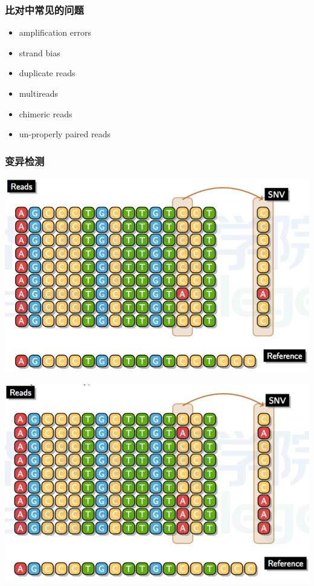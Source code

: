 \documentclass[12pt]{beamer}
\begin{document}
\begin{frame}\frametitle{比对中常见的问题}
  \begin{itemize}
  \item amplification errors
  \item strand bias
  \item duplicate reads
  \item multireads
  \item chimeric reads
  \item un-properly paired reads    
  \end{itemize}
  \end{frame}

\begin{frame}\frametitle{变异检测}
  \includegraphics[width=\textwidth]{figures/old_slides/snv1.png}
\end{frame}

\begin{frame}
  \includegraphics[width=\textwidth]{figures/old_slides/snv2.png}
\end{frame}
\end{document}
